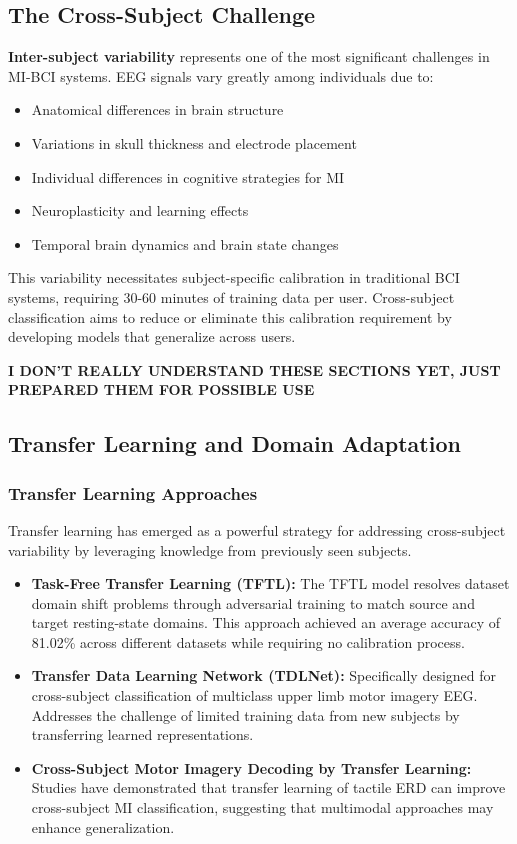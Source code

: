 \documentclass[12pt]{article}
\begin{document}
\subsection{The Cross-Subject Challenge}

\textbf{Inter-subject variability} represents one of the most significant challenges in MI-BCI systems. EEG signals vary greatly among individuals due to:
\begin{itemize}
    \item Anatomical differences in brain structure
    \item Variations in skull thickness and electrode placement
    \item Individual differences in cognitive strategies for MI
    \item Neuroplasticity and learning effects
    \item Temporal brain dynamics and brain state changes
\end{itemize}

This variability necessitates subject-specific calibration in traditional BCI systems, requiring 30-60 minutes of training data per user. Cross-subject classification aims to reduce or eliminate this calibration requirement by developing models that generalize across users.

\noindent\makebox[\linewidth]{\rule{\paperwidth}{0.4pt}}

\textbf{I DON'T REALLY UNDERSTAND THESE SECTIONS YET, JUST PREPARED THEM FOR POSSIBLE USE}
\subsection{Transfer Learning and Domain Adaptation}

\subsubsection{Transfer Learning Approaches}

Transfer learning has emerged as a powerful strategy for addressing cross-subject variability by leveraging knowledge from previously seen subjects.
\begin{itemize}
    \item \textbf{Task-Free Transfer Learning (TFTL):} The TFTL model resolves dataset domain shift problems through adversarial training to match source and target resting-state domains. This approach achieved an average accuracy of 81.02\% across different datasets while requiring no calibration process.
    \item \textbf{Transfer Data Learning Network (TDLNet):} Specifically designed for cross-subject classification of multiclass upper limb motor imagery EEG. Addresses the challenge of limited training data from new subjects by transferring learned representations.
    \item \textbf{Cross-Subject Motor Imagery Decoding by Transfer Learning:} Studies have demonstrated that transfer learning of tactile ERD can improve cross-subject MI classification, suggesting that multimodal approaches may enhance generalization.
\end{itemize}
\end{document}
